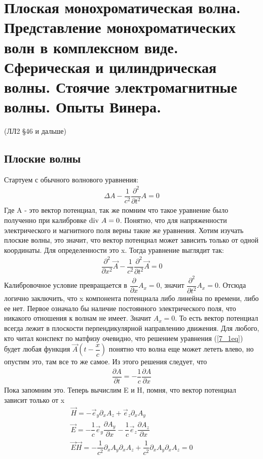 
	\section{Плоская монохроматическая волна. Представление монохроматических волн в
		комплексном виде. Сферическая и цилиндрическая волны. Стоячие электромагнитные
		волны. Опыты Винера.}
	(ЛЛ2 \S 46 и дальше)\\
	\subsection*{Плоские волны}
	Стартуем с обычного волнового уравнения:
	\begin{align*}
	\Delta A - \dfrac{1}{c^2} \dfrac{\partial^2}{\partial t^2}A = 0
	\end{align*}
	Где A - это вектор потенциал, так же помним что такое уравнение было полученно при калибровке $\mathop{\mathrm{div}}\nolimits\, A = 0$. Понятно, что для напряженности электрического и магнитного поля верны такие же уравнения. Хотим изучать плоские волны, это значит, что вектор потенциал может зависить только от одной координаты. Для определенности это x. Тогда уравнение выглядит так:
	\begin{align}
	\dfrac{\partial^2}{\partial x^2}\vec{A} - \dfrac{1}{c^2} \dfrac{\partial^2}{\partial t^2}\vec{A} = 0
	\label{7_1eq}
	\end{align}
	Калибровочное условие превращается в $ \dfrac{\partial}{\partial x}A_x = 0$, значит $\dfrac{\partial^2}{\partial t^2}A_x  = 0$. Отсюда логично заключить, что x компонента потенциала либо линейна по времени, либо ее нет. Первое означало бы наличие постоянного электрического поля, что никакого отношения к волнам не имеет. Значит $A_x = 0$. То есть вектор потенциал всегда лежит в плоскости перпендикулярной направлению движения. Для любого, кто читал конспект по матфизу очевидно, что решением уравнения (\ref{7_1eq}) будет любая функция $\vec{A}(t - \dfrac{x}{c})$ понятно что волна еще может лететь влево, но опустим это, там все то же самое. Из этого решения следует, что 
	\begin{align}
	\dfrac{\partial A}{\partial t} = -\dfrac{1}{c} \dfrac{\partial A}{\partial x}
	\label{7_2eq}
	\end{align}
	Пока запомним это. Теперь вычислим E и H, помня, что вектор потенциал зависит только от x
	\begin{align*}
	\vec{H} = - \vec{e}_y \partial_x A_z + \vec{e}_z \partial_x A_y\\
	\vec{E} = -\dfrac{1}{c} \vec{e}_y\dfrac{\partial A_y}{\partial x} -\dfrac{1}{c} \vec{e}_z \dfrac{\partial A_z}{\partial x}\\
	\vec{E}\vec{H} = -\dfrac{1}{c^2} \partial_x A_y \partial_x A_z +\dfrac{1}{c^2} \partial_x A_y \partial_x A_z = 0
	\end{align*}
